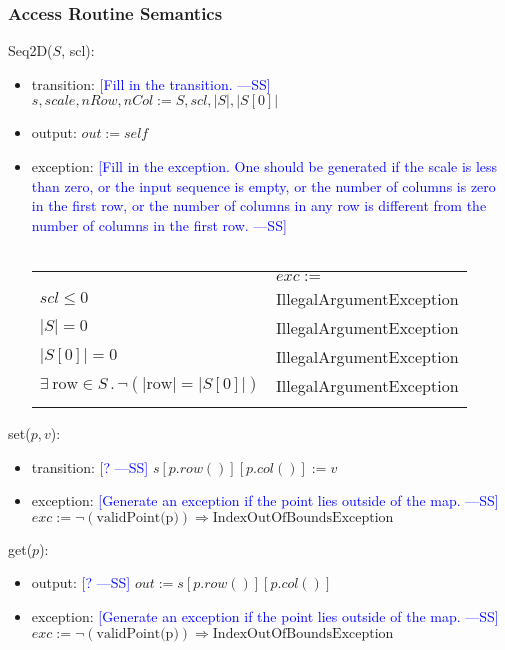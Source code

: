 \documentclass[12pt]{article}
\newcommand{\authornote}[3]{\textcolor{#1}{[#3 ---#2]}}
\newcommand{\authornote}[3]{}
\newcommand{\wss}[1]{\authornote{blue}{SS}{#1}}
\begin{document}
\subsubsection* {Access Routine Semantics}

Seq2D($S$, scl):
\begin{itemize}
\item transition: \wss{Fill in the transition.}\\
$s, scale, nRow, nCol := S, scl, |S|, |S[0]|$
\item output: $\mathit{out} := \mathit{self}$
\item exception: \wss{Fill in the exception.  One should be generated if the
    scale is less than zero, or the input sequence is empty, or the number of
    columns is zero in the first row, or the number of columns in any row is
    different from the number of columns in the first row.}\\ \\
\begin{tabular}{|p{6cm}|l|}
\hhline{~|-|}
\multicolumn{1}{r|}{} & \multicolumn{1}{l|}{$exc :=$}\\
\hhline{|-|-|}
$scl \leq 0$ & IllegalArgumentException \\
\hhline{|-|-|}
$|S| = 0$ & IllegalArgumentException \\
\hhline{|-|-|}
$|S[0]|=0$& IllegalArgumentException \\
\hhline{|-|-|}
$\exists\ \mbox{row} \in S \,.\, \lnot(|\mbox{row}| = |S[0]|)$ & IllegalArgumentException \\
\hhline{|-|-|}
\end{tabular}


\end{itemize}

\noindent set($p, v$):
\begin{itemize}
\item transition: \wss{?} $s[p.row()][p.col()] := v$
\item exception: \wss{Generate an exception if the point lies outside of the
    map.} \\
$exc := \lnot (\mbox{validPoint(p)}) \Rightarrow \mbox{IndexOutOfBoundsException}$
\end{itemize}

\noindent get($p$):
\begin{itemize}
\item output: \wss{?} $out := s[p.row()][p.col()]$
\item exception: \wss{Generate an exception if the point lies outside of the
    map.} \\
$exc := \lnot (\mbox{validPoint(p)}) \Rightarrow \mbox{IndexOutOfBoundsException}$
\end{itemize}
\end{document}
